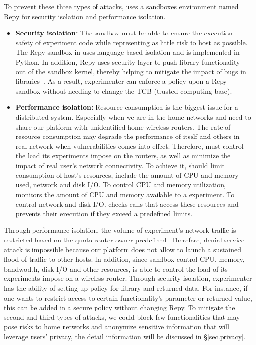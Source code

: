To prevent these three types of attacks, \sysname uses a sandboxes environment named Repy for security isolation and performance isolation. 
\begin{itemize} 
\item \textbf{Security isolation:} The sandbox must be able to ensure the execution safety of experiment code while representing as little risk to host as possible. The Repy sandbox in \sysname uses language-based isolation and is implemented in Python. In addition, Repy uses security layer to push library functionality out of the sandbox kernel, thereby helping to mitigate the impact of bugs in libraries~\cite{cappos2010retaining}. As a result, experimenter can enforce a policy upon a Repy sandbox without needing to change the TCB (trusted computing base).  
\item \textbf{Performance isolation:} Resource consumption is the biggest issue for a distributed system. Especially when we are in the home networks and need to share our platform with unidentified home wireless routers. The rate of resource consumption may degrade the performance of itself and others in real network when vulnerabilities comes into effect\cite{joshi2013survey}. Therefore, \sysname must control the load its experiments impose on the routers, as well as minimize the impact of real user's network connectivity. To achieve it, \sysname should limit consumption of host's resources, include the amount of CPU and memory used, network and disk I/O. To control CPU and memory utilization, \sysname monitors the amount of CPU and memory available to a experiment. To control network and disk I/O, \sysname checks calls that access these resources and prevents their execution if they exceed a predefined limits. 
\end{itemize}

Through performance isolation, the volume of experiment's network traffic is restricted based on the quota router owner predefined. Therefore, denial-service attack is impossible because our platform does not allow to launch a sustained flood of traffic to other hosts. In addition, since sandbox control CPU, memory, bandwodth, disk I/O and other resources, \sysname is able to control the load of its experiments impose on a wireless router. Through security isolation, experimenter has the ability of setting up policy for library and returned data. For instance, if one wants to restrict access to certain functionality's parameter or returned value, this can be added in a secure policy without changing Repy. To mitigate the second and third types of attacks, we could block few functionalities that may pose risks to home networks and anonymize sensitive information that will leverage users' privacy, the detail information will be discussed in \S{\ref{sec.privacy}}. 

